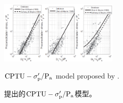 \begin{figure}[!p]
    \centering
    \includegraphics[width=0.5\textwidth]{figures/figure-14.png}
    \caption{$\rm{CPTU}-\sigma_p'/P_a$ model proposed by \citet{Chen1996488, Kulhawy1990}.}
    \vspace{-5pt}
    \addtocounter{figure}{-1}
    \renewcommand{\figurename}{图}
    \caption{\citet{Chen1996488, Kulhawy1990}提出的$\rm{CPTU}-\sigma_p'/P_a$模型。}
    \label{figure:14}
    \renewcommand{\figurename}{Figure}
\end{figure}
